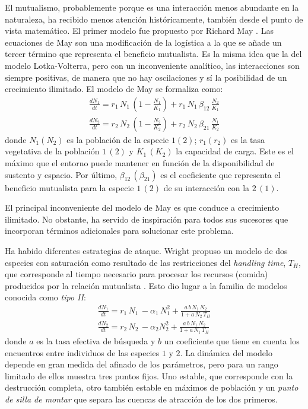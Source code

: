 El mutualismo, probablemente porque es una interacción menos abundante en la naturaleza, ha recibido menos atención históricamente, también desde el punto de vista matemático. El primer modelo fue propuesto por Richard May \cite{may1981models}. Las ecuaciones de May son una modificación de la logística a la que se añade un tercer término que representa el beneficio mutualista. Es la misma idea que la del modelo Lotka-Volterra, pero con un inconveniente analítico, las interacciones son siempre positivas, de manera que no hay oscilaciones y sí la posibilidad de un crecimiento ilimitado. El modelo de May se formaliza como:
\begin{align}
\frac{dN_1}{dt}=r_1 \,N_1\,\left(1-\frac{N_1}{K_1}\right)+r_1\, N_1\,\beta_{12}\, \frac{N_2}{K_1} \nonumber \\ 
\frac{dN_2}{dt}=r_2\, N_2\, \left(1-\frac{N_2}{K_2}\right)+r_2\, N_2\, \beta_{21} \, \frac{N_1}{K_2} 
\label{myeq2}
\end{align}
\noindent donde $N_1(N_2)$ es la población de la especie $1(2)$; $r_1(r_2)$ es la tasa vegetativa de la población $1\, (2)$ y $K_1\, (K_2)$ la capacidad de carga. Este es el máximo que el entorno puede mantener en función de la disponibilidad de sustento y espacio. Por último, $\beta_{12}\,(\beta_{21})$ es el coeficiente que representa el beneficio mutualista para la especie $1\,(2)$ de su interacción con la $2\,(1)$.

El principal inconveniente del modelo de May es que conduce a crecimiento ilimitado. No obstante, ha servido de inspiración para todos sus sucesores que incorporan términos adicionales para solucionar este problema.

Ha habido diferentes estrategias de ataque. Wright propuso un modelo de dos especies con saturación como resultado de las restricciones del \textit{handling time}, $T_H$, que corresponde al tiempo necesario para procesar los recursos (comida) producidos por la relación mutualista \cite{wright1989}. Esto dio lugar a la familia de modelos conocida como \textit{tipo II}:
\begin{align}
\frac{dN_1}{dt}=r_1\, N_1\, - \alpha_1 \, N_1^2+ \frac{a\, b\, N_1\,N_2}{1+ a\, N_2\,T_H} \nonumber\\
\frac{dN_2}{dt}=r_2\, N_2\, - \alpha_2 N_2^2 + \frac{a\,b\,N_1\,N_2}{1+a\, N_1\, T_H}
\label{eq_typeII}
\end{align}
\noindent donde $a$ es la tasa efectiva de búsqueda y $b$ un coeficiente que tiene en cuenta los encuentros entre individuos de las especies $1$ y $2$. La dinámica del modelo depende en gran medida del afinado de los parámetros, pero para un rango limitado de ellos muestra tres puntos fijos. Uno estable, que corresponde con la destrucción completa, otro también estable en máximos de población y un \textit{punto de silla de montar} que separa las cuencas de atracción de los dos primeros. 

